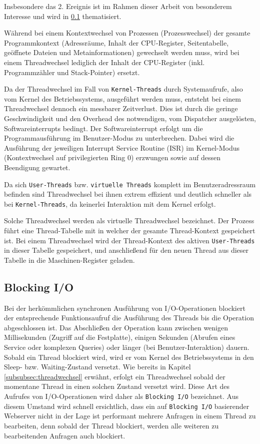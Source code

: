 Insbesondere das 2. Ereignis ist im Rahmen dieser Arbeit von besonderem Interesse und wird in \ref{subsec:blocking-i/o} thematisiert.

Während bei einem Kontextwechsel von Prozessen (Prozesswechsel) der gesamte Programmkontext (Adressräume, Inhalt der CPU-Register,
Seitentabelle, geöffnete Dateien und Metainformationen)
gewechselt werden muss, wird bei einem Threadwechsel lediglich der Inhalt der CPU-Register (inkl. Programmzähler und Stack-Pointer)
ersetzt.\parencite{Mosberger2002}

\noindent
Da der Threadwechsel im Fall von \verb|Kernel-Threads| durch Systemaufrufe, also vom Kernel des Betriebssystems, ausgeführt werden muss, entsteht
bei einem Threadwechsel dennoch ein messbarer Zeitverlust.
Dies ist durch die geringe Geschwindigkeit und den Overhead des notwendigen, vom Dispatcher ausgelösten, Softwareinterrupts bedingt.
Der Softwareinterrupt erfolgt um die Programmausführung im Benutzer-Modus zu unterbrechen.
Dabei wird die Ausführung der jeweiligen Interrupt Service Routine (ISR) im
Kernel-Modus (Kontextwechsel auf privilegierten Ring 0) erzwungen sowie auf dessen Beendigung gewartet.

Da sich \verb|User-Threads| bzw. \verb|virtuelle Threads| komplett im Benutzeradressraum befinden sind Threadwechsel
bei ihnen extrem effizient und deutlich schneller als bei \verb|Kernel-Threads|, da keinerlei Interaktion mit dem Kernel erfolgt.

Solche Threadwechsel werden als virtuelle Threadwechsel bezeichnet.
Der Prozess führt eine Thread-Tabelle mit in welcher der gesamte Thread-Kontext gespeichert ist.
Bei einem Threadwechsel wird der Thread-Kontext des aktiven \verb|User-Threads| in dieser Tabelle gespeichert, und anschließend für den neuen Thread
aus dieser Tabelle in die Maschinen-Register geladen.
\parencite[Kapitel 2.2.6 Thread Scheduling]{Tanenbaum2016}
\newpage
\subsection{Blocking I/O}
\label{subsec:blocking-i/o}
Bei der herkömmlichen synchronen Ausführung von I/O-Operationen blockiert der entsprechende Funktionsaufruf die Ausführung des
Threads bis die Operation abgeschlossen ist. Das Abschließen der Operation kann zwischen wenigen Millisekunden (Zugriff auf die Festplatte),
einigen Sekunden (Abrufen eines Service oder komplexen Queries) oder länger (bei Benutzer-Interaktion) dauern.
Sobald ein Thread blockiert wird, wird er vom Kernel des Betriebssystems in den Sleep- bzw. Waiting-Zustand versetzt.
Wie bereits in Kapitel \ref{subsubsec:threadwechsel} erwähnt, erfolgt ein Threadwechsel sobald der momentane Thread in einen solchen Zustand
versetzt wird.
Diese Art des Aufrufes von I/O-Operationen wird daher als \verb|Blocking I/O| bezeichnet.
Aus diesem Umstand wird schnell ersichtlich, dass ein auf \verb|Blocking I/O| basierender Webserver nicht in der Lage ist
performant mehrere Anfragen in einem Thread zu bearbeiten, denn sobald der Thread blockiert, werden alle weiteren zu bearbeitenden Anfragen
auch blockiert.
